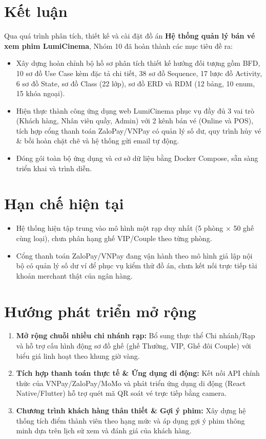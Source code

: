 \section{Kết luận}
Qua quá trình phân tích, thiết kế và cài đặt đồ án \textbf{Hệ thống quản lý bán vé xem phim LumiCinema}, Nhóm 10 đã hoàn thành các mục tiêu đề ra:
\begin{itemize}[leftmargin=1.2cm]
  \item Xây dựng hoàn chỉnh bộ hồ sơ phân tích thiết kế hướng đối tượng gồm BFD, 10 sơ đồ Use Case kèm đặc tả chi tiết, 38 sơ đồ Sequence, 17 lược đồ Activity, 6 sơ đồ State, sơ đồ Class (22 lớp), sơ đồ ERD và RDM (12 bảng, 10 enum, 15 khóa ngoại).
  \item Hiện thực thành công ứng dụng web LumiCinema phục vụ đầy đủ 3 vai trò (Khách hàng, Nhân viên quầy, Admin) với 2 kênh bán vé (Online và POS), tích hợp cổng thanh toán ZaloPay/VNPay có quản lý số dư, quy trình hủy vé \& bồi hoàn chặt chẽ và hệ thống gửi email tự động.
  \item Đóng gói toàn bộ ứng dụng và cơ sở dữ liệu bằng Docker Compose, sẵn sàng triển khai và trình diễn.
\end{itemize}

\section{Hạn chế hiện tại}
\begin{itemize}[leftmargin=1.2cm]
  \item Hệ thống hiện tập trung vào mô hình một rạp duy nhất (5 phòng $\times$ 50 ghế cùng loại), chưa phân hạng ghế VIP/Couple theo từng phòng.
  \item Cổng thanh toán ZaloPay/VNPay đang vận hành theo mô hình giả lập nội bộ có quản lý số dư ví để phục vụ kiểm thử đồ án, chưa kết nối trực tiếp tài khoản merchant thật của ngân hàng.
\end{itemize}

\section{Hướng phát triển mở rộng}
\begin{enumerate}[leftmargin=1.2cm]
  \item \textbf{Mở rộng chuỗi nhiều chi nhánh rạp:} Bổ sung thực thể Chi nhánh/Rạp và hỗ trợ cấu hình động sơ đồ ghế (ghế Thường, VIP, Ghế đôi Couple) với biểu giá linh hoạt theo khung giờ vàng.
  \item \textbf{Tích hợp thanh toán thực tế \& Ứng dụng di động:} Kết nối API chính thức của VNPay/ZaloPay/MoMo và phát triển ứng dụng di động (React Native/Flutter) hỗ trợ quét mã QR soát vé trực tiếp bằng camera.
  \item \textbf{Chương trình khách hàng thân thiết \& Gợi ý phim:} Xây dựng hệ thống tích điểm thành viên theo hạng mức và áp dụng gợi ý phim thông minh dựa trên lịch sử xem và đánh giá của khách hàng.
\end{enumerate}
